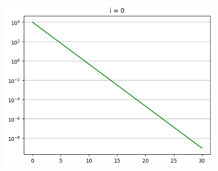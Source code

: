 \documentclass{article}
\begin{document}
\begin{CJK*}{UTF8}{bsmi}
\begin{large}
\begin{figure}[!htbp]
{\begin{minipage}[t]{0.5\linewidth}
            \includegraphics[scale=0.4]{output2.png}
            \end{minipage}%
            }%

        \end{figure}
    \end{large}


\end{CJK*}
\end{document}
